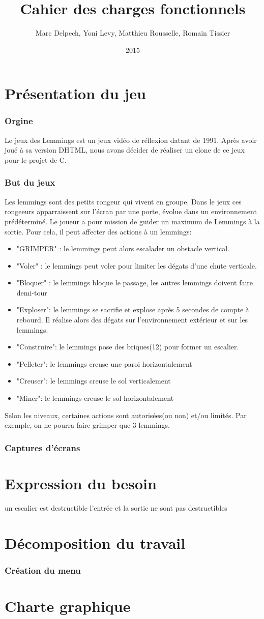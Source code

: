 \documentclass[a4paper]{article}
\title{Cahier des charges fonctionnels}
\author{Marc Delpech, Yoni Levy, Matthieu Rousselle, Romain Tissier}
\date{2015}
\begin{document}
	\maketitle
	\newpage
	\tableofcontents
	\newpage
	\part{Présentation du jeu}
		\section{Orgine}
			Le jeux des Lemmings est un jeux vidéo de réflexion datant de 1991. Après avoir joué à sa version DHTML, nous avons décider de réaliser un clone de ce jeux pour le projet de C. 
		\section{But du jeux}
			Les lemmings sont des petits rongeur qui vivent en groupe. Dans le jeux ces rongeeurs apparraissent sur l'écran par une porte, évolue dans un environnement prédéterminé. Le joueur a pour mission de guider un maximum de Lemmings à la sortie. Pour cela, il peut affecter des actions à un lemmings: 
			\begin{itemize}
				\item "GRIMPER" : le lemmings peut alors escalader un obstacle vertical.
				\item "Voler" : le lemmings peut voler pour limiter les dégats d'une chute verticale. 
				\item "Bloquer" : le lemmings bloque le passage, les autres lemmings doivent faire demi-tour
   				\item "Exploser": le lemmings se sacrifie et explose après 5 secondes de compte à rebourd. Il réalise alors des dégats sur l'environnement extérieur et sur les lemmings. 
				\item "Construire": le lemmings pose des briques(12) pour former un escalier. 
    				\item "Pelleter": le lemmings creuse une paroi horizontalement
				\item "Creuser": le lemmings creuse le sol verticalement
				\item "Miner": le lemmings creuse le sol horizontalement
			\end{itemize}
			Selon les niveaux, certaines actions sont autorisées(ou non) et/ou limités. Par exemple, on ne pourra faire grimper que 3 lemmings.  
		\section{Captures d'écrans}
	\part{Expression du besoin}
		un escalier est destructible
		l'entrée et la sortie ne sont pas destructibles
	\part{Décomposition du travail}
		\section{Création du menu}	
	\part{Charte graphique}
\end{document}
